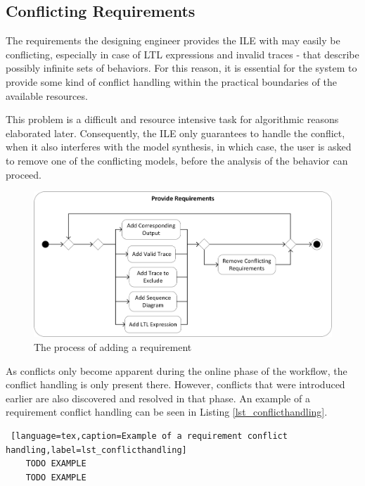 \subsection{Conflicting Requirements} \label{subs_conf}
The requirements the designing engineer provides the ILE with may easily be conflicting, especially in case of LTL expressions and invalid traces - that describe possibly infinite sets of behaviors. For this reason, it is essential for the system to provide some kind of conflict handling within the practical boundaries of the available resources. 

This problem is a difficult and resource intensive task for algorithmic reasons elaborated later. Consequently, the ILE only guarantees to handle the conflict, when it also interferes with the model synthesis, in which case, the user is asked to remove one of the conflicting models, before the analysis of the behavior can proceed.

\begin{figure}[!ht] 
	\centering
		\includegraphics[width=130mm, keepaspectratio]{figures/methodology_providerequirementsworkflow.png}
	\caption{The process of adding a requirement}
	\label{fig_providerequirementsworkflow}
\end{figure}


As conflicts only become apparent during the online phase of the workflow, the conflict handling is only present there. However, conflicts that were introduced earlier are also discovered and resolved in that phase. An example of a requirement conflict handling can be seen in Listing \ref{lst_conflicthandling}.

\bigskip
\begin{minipage}{\linewidth}
\begin{lstlisting} [language=tex,caption=Example of a requirement conflict handling,label=lst_conflicthandling]
	TODO EXAMPLE
	TODO EXAMPLE
\end{lstlisting}%
\end{minipage}

